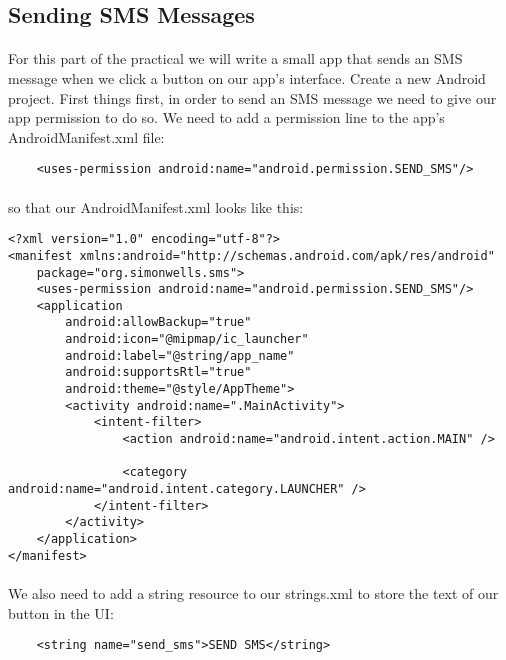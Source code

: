 \subsection{Sending SMS Messages}
\paragraph{} For this part of the practical we will write a small app that sends an SMS message when we click a button on our app's interface. Create a new Android project. First things first, in order to send an SMS message we need to give our app permission to do so. We need to add a permission line to the app's AndroidManifest.xml file:

\begin{lstlisting}
    <uses-permission android:name="android.permission.SEND_SMS"/>
\end{lstlisting}

\paragraph{} so that our AndroidManifest.xml looks like this:

\begin{lstlisting}
<?xml version="1.0" encoding="utf-8"?>
<manifest xmlns:android="http://schemas.android.com/apk/res/android"
    package="org.simonwells.sms">
    <uses-permission android:name="android.permission.SEND_SMS"/>
    <application
        android:allowBackup="true"
        android:icon="@mipmap/ic_launcher"
        android:label="@string/app_name"
        android:supportsRtl="true"
        android:theme="@style/AppTheme">
        <activity android:name=".MainActivity">
            <intent-filter>
                <action android:name="android.intent.action.MAIN" />

                <category android:name="android.intent.category.LAUNCHER" />
            </intent-filter>
        </activity>
    </application>
</manifest>
\end{lstlisting}

\paragraph{} We also need to add a string resource to our strings.xml to store the text of our button in the UI:

\begin{lstlisting}
    <string name="send_sms">SEND SMS</string>
\end{lstlisting}

